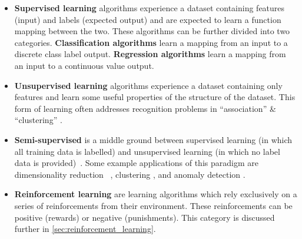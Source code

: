 \begin{itemize}
    \item \textbf{Supervised learning} algorithms experience a dataset
    containing features (input) and labels (expected output) and are expected
    to learn a function mapping between the two. These algorithms can be further
    divided into two categories. \textbf{Classification algorithms} learn a
    mapping from an input to a discrete class label output. \textbf{Regression
    algorithms} learn a mapping from an input to a continuous value output.


    \item \textbf{Unsupervised learning} algorithms experience a dataset containing only features and learn some useful properties of the structure of the dataset. This form of learning often addresses recognition problems in ``association'' \& ``clustering'' \cite{barlow1999ul}.

    \item \textbf{Semi-supervised} is a middle ground between supervised learning (in which all training data is labelled) and unsupervised learning (in which no label data is provided)~\cite{books/mit/06/CSZ2006}. Some example applications of this paradigm are dimensionality reduction ~\cite{Zhang2007}, clustering \cite{Bair2013}, and anomaly detection \cite{DBLP:journals/corr/abs-1805-06725}.

    \item \textbf{Reinforcement learning} are learning algorithms which rely exclusively on a series of reinforcements from their environment. These reinforcements can be positive (rewards) or negative (punishments). This category is discussed further in \autoref{sec:reinforcement_learning}.
\end{itemize}

